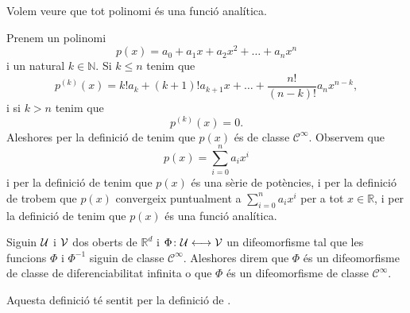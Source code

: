 \documentclass[../Apunts.tex]{subfiles}
\begin{document}
	\begin{example}
		\label{ex:els polinomis són funcions analítiques}
		Volem veure que tot polinomi és una funció analítica.
		\begin{solution}
			Prenem un polinomi
			\[p(x)=a_{0}+a_{1}x+a_{2}x^{2}+\dots+a_{n}x^{n}\]
			i un natural \(k\in\mathbb{N}\). Si \(k\leq n\) tenim que %
			\[p^{(k)}(x)=k!a_{k}+(k+1)!a_{k+1}x+\dots+\frac{n!}{(n-k)!}a_{n}x^{n-k},\]
			i si \(k>n\) tenim que
			\[p^{(k)}(x)=0.\]
			Aleshores per la definició de  tenim que \(p(x)\) és de classe \(\mathcal{C}^{\infty}\). Observem que
			\[p(x)=\sum_{i=0}^{n}a_{i}x^{i}\]
			i per la definició de  tenim que \(p(x)\) és una sèrie de potències, i per la definició de  trobem que \(p(x)\) convergeix puntualment a \(\sum_{i=0}^{n}a_{i}x^{i}\) per a tot \(x\in\mathbb{R}\), i per la definició de  tenim que \(p(x)\) és una funció analítica.
		\end{solution}
	\end{example}
	\begin{definition}
		\label{def:difeomorfisme de classe C infinit}\label{def:difeomorfisme de classe de diferenciabilitat infinita}
		Siguin \(\mathcal{U}\) i \(\mathcal{V}\) dos oberts de \(\mathbb{R}^{d}\) i \(\Phi\colon\mathcal{U}\longleftrightarrow\mathcal{V}\) un difeomorfisme tal que les funcions \(\Phi\) i \(\Phi^{-1}\) siguin de classe \(\mathcal{C}^{\infty}\). Aleshores direm que \(\Phi\) és un difeomorfisme de classe de diferenciabilitat infinita o que \(\Phi\) és un difeomorfisme de classe \(\mathcal{C}^{\infty}\).
		
		Aquesta definició té sentit per la definició de .
	\end{definition}
\end{document}
